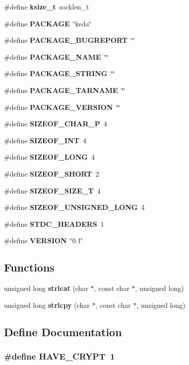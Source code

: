 \begin{CompactItemize}
\#define {\bf ksize\_\-t}~socklen\_\-t
\item 
\#define {\bf PACKAGE}~\char`\"{}keda\char`\"{}
\item 
\#define {\bf PACKAGE\_\-BUGREPORT}~\char`\"{}\char`\"{}
\item 
\#define {\bf PACKAGE\_\-NAME}~\char`\"{}\char`\"{}
\item 
\#define {\bf PACKAGE\_\-STRING}~\char`\"{}\char`\"{}
\item 
\#define {\bf PACKAGE\_\-TARNAME}~\char`\"{}\char`\"{}
\item 
\#define {\bf PACKAGE\_\-VERSION}~\char`\"{}\char`\"{}
\item 
\#define {\bf SIZEOF\_\-CHAR\_\-P}~4
\item 
\#define {\bf SIZEOF\_\-INT}~4
\item 
\#define {\bf SIZEOF\_\-LONG}~4
\item 
\#define {\bf SIZEOF\_\-SHORT}~2
\item 
\#define {\bf SIZEOF\_\-SIZE\_\-T}~4
\item 
\#define {\bf SIZEOF\_\-UNSIGNED\_\-LONG}~4
\item 
\#define {\bf STDC\_\-HEADERS}~1
\item 
\#define {\bf VERSION}~\char`\"{}0.1\char`\"{}
\end{CompactItemize}
\subsection*{Functions}
\begin{CompactItemize}
\item 
unsigned long {\bf strlcat} (char $\ast$, const char $\ast$, unsigned long)
\item 
unsigned long {\bf strlcpy} (char $\ast$, const char $\ast$, unsigned long)
\end{CompactItemize}


\subsection{Define Documentation}
\subsubsection{\setlength{\rightskip}{0pt plus 5cm}\#define HAVE\_\-CRYPT~1}\label{config_8h_18dd0f625117f7ec58d7062a9b29f525}


